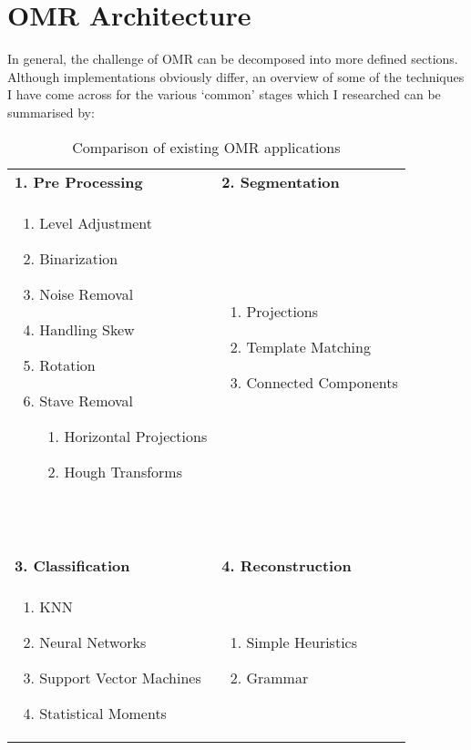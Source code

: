 \section{OMR Architecture}

In general, the challenge of OMR can be decomposed into more defined sections. Although implementations obviously differ, an overview of some of the techniques I have come across for the various `common' stages which I researched can be summarised by:

\begin{table}[h]
\small
\begin{tabularx}{\linewidth}{ X | X }
  \textbf{1. Pre Processing} & \textbf{2. Segmentation} \\

  \begin{enumerate}[leftmargin=*]
    \item Level Adjustment
    \item Binarization
    \item Noise Removal
    \item Handling Skew
    \item Rotation
    \item Stave Removal
      \begin{enumerate}
        \item Horizontal Projections
        \item Hough Transforms
      \end{enumerate}
  \end{enumerate}

  &

  \begin{enumerate}[leftmargin=*]
    \item Projections
    \item Template Matching
    \item Connected Components
  \end{enumerate}

  \\
  \ & \ \\
  \hline
  \ & \ \\

  \textbf{3. Classification} &  \textbf{4. Reconstruction} \\

  \begin{enumerate}[leftmargin=*]
    \item \acrfull{KNN}
    \item Neural Networks
    \item Support Vector Machines
    \item Statistical Moments
  \end{enumerate}

  &

  \begin{enumerate}[leftmargin=*]
    \item Simple Heuristics
    \item Grammar
  \end{enumerate}

\end{tabularx}
\caption{Comparison of existing OMR applications}
\end{table}
